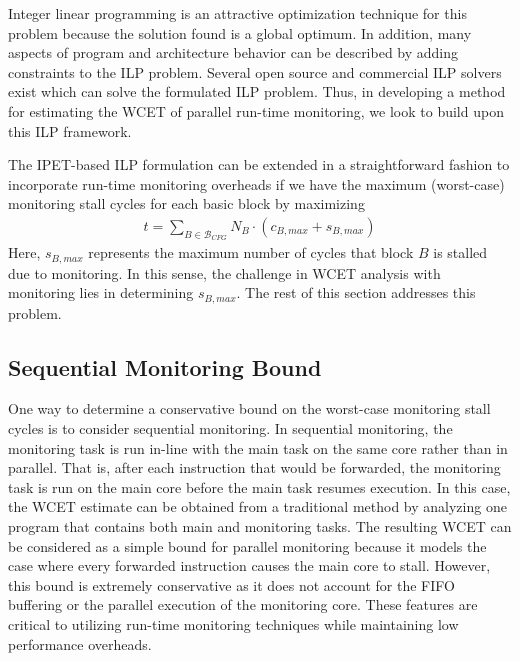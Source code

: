 Integer linear programming is an attractive optimization technique
for this problem because the solution found is a global optimum. In
addition, many aspects of program and architecture behavior can be described by
adding constraints to the ILP problem. 
Several open source and commercial ILP solvers exist which can solve the formulated ILP problem.
Thus, in developing a method for
estimating the WCET of parallel run-time monitoring, we look to build upon this
ILP framework.

The IPET-based ILP formulation can be 
extended in a straightforward fashion to incorporate run-time monitoring overheads
if we have the maximum (worst-case) 
monitoring stall cycles for each basic block by maximizing
\begin{align*}
  t = \sum_{B \in \mathcal{B}_{CFG}}{N_{B} \cdot (c_{B,max} + s_{B,max})}
\end{align*}
Here, $s_{B,max}$ represents the maximum number of cycles that block $B$ is stalled 
due to monitoring. In this sense, the challenge in WCET analysis with
monitoring lies in determining $s_{B,max}$. 
The rest of this section addresses this problem.

\subsection{Sequential Monitoring Bound}
\label{sec:formulation:sequential}

One way to determine a conservative bound on the worst-case monitoring stall cycles 
is to consider sequential monitoring.
In
sequential monitoring, the monitoring task is run in-line with the main task on the same core
rather than in parallel. That is, after each instruction that would be
forwarded, the monitoring task is run on the main core before the main task
resumes execution. In this case, the WCET estimate can be obtained from 
a traditional method by analyzing one program that contains both main and
monitoring tasks.
The resulting WCET can be considered as a simple bound
for parallel monitoring because it models the case where every forwarded 
instruction causes the main core to stall.
However, this bound is
extremely conservative as it does not account for the FIFO buffering or the
parallel execution of the monitoring core. These features are critical to
utilizing run-time monitoring techniques while maintaining low performance
overheads.

